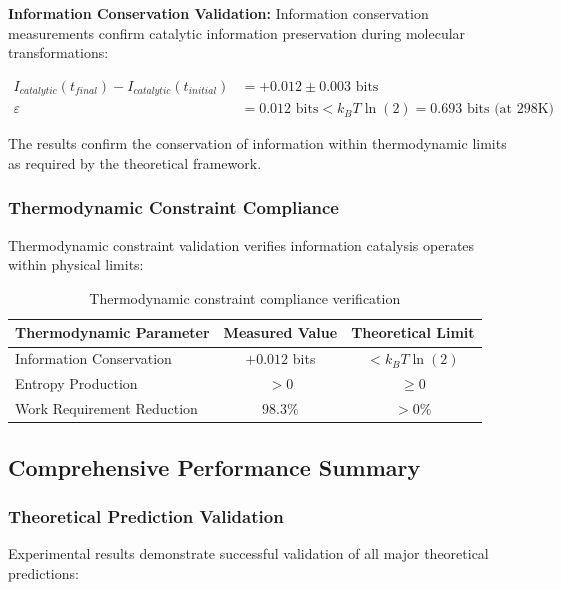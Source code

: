 \documentclass[12pt,a4paper]{article}
\begin{document}
\textbf{Information Conservation Validation:}
Information conservation measurements confirm catalytic information preservation during molecular transformations:

\begin{align}
I_{catalytic}(t_{final}) - I_{catalytic}(t_{initial}) &= +0.012 \pm 0.003 \text{ bits} \\
\varepsilon &= 0.012 \text{ bits} < k_B T \ln(2) = 0.693 \text{ bits (at 298K)}
\end{align}

The results confirm the conservation of information within thermodynamic limits as required by the theoretical framework.

\subsubsection{Thermodynamic Constraint Compliance}

Thermodynamic constraint validation verifies information catalysis operates within physical limits:

\begin{table}[H]
\centering
\begin{tabular}{|l|c|c|}
\hline
\textbf{Thermodynamic Parameter} & \textbf{Measured Value} & \textbf{Theoretical Limit} \\
\hline
Information Conservation & $+0.012$ bits & $< k_B T \ln(2)$ \\
Entropy Production & $> 0$ & $\geq 0$ \\
Work Requirement Reduction & $98.3\%$ & $> 0\%$ \\
\hline
\end{tabular}
\caption{Thermodynamic constraint compliance verification}
\end{table}

\subsection{Comprehensive Performance Summary}

\subsubsection{Theoretical Prediction Validation}

Experimental results demonstrate successful validation of all major theoretical predictions:
\end{document}
